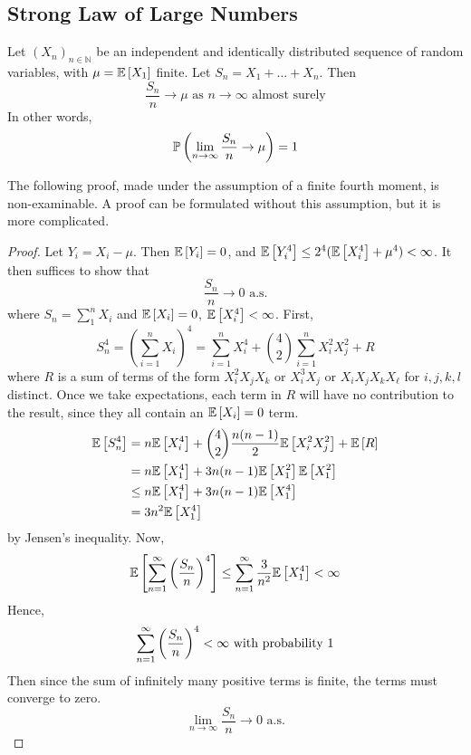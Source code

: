 \documentclass{article}
\begin{document}
\subsection{Strong Law of Large Numbers}
\begin{theorem}
	Let $(X_n)_{n \in \mathbb N}$ be an independent and identically distributed sequence of random variables, with $\mu = \mathbb{E}\left[{X_1}\right]$ finite. Let $S_n = X_1 + \dots + X_n$. Then
	\[ \frac{S_n}{n} \to \mu \text{ as } n \to \infty \text{ almost surely} \]
	In other words,
	\[ \mathbb{P}\left({\lim_{n \to \infty}\frac{S_n}{n}\to \mu}\right) = 1 \]
\end{theorem}
\noindent The following proof, made under the assumption of a finite fourth moment, is non-examinable. A proof can be formulated without this assumption, but it is more complicated.
\begin{proof}
	Let $Y_i = X_i - \mu$. Then $\mathbb{E}\left[{Y_i}\right] = 0$, and $\mathbb{E}\left[{Y_i^4}\right] \leq 2^4(\mathbb{E}\left[{X_i^4}\right] + \mu^4) < \infty$. It then suffices to show that
	\[ \frac{S_n}{n} \to 0 \text{ a.s.} \]
	where $S_n = \sum_1^n X_i$ and $\mathbb{E}\left[{X_i}\right] = 0$, $\mathbb{E}\left[{X_i^4}\right] < \infty$. First,
	\[ S_n^4 = \left( \sum_{i=1}^n X_i \right)^4 = \sum_{i=1}^n X_i^4 + \binom{4}{2}\sum_{i=1}^n X_i^2 X_j^2 + R \]
	where $R$ is a sum of terms of the form $X_i^2 X_j X_k$ or $X_i^3 X_j$ or $X_i X_j X_k X_\ell$ for $i, j, k, l$ distinct. Once we take expectations, each term in $R$ will have no contribution to the result, since they all contain an $\mathbb{E}\left[{X_i}\right] = 0$ term.
	\begin{align*}
		\mathbb{E}\left[{S_n^4}\right] &= n\mathbb{E}\left[{X_i^4}\right] + \binom{4}{2}\frac{n(n-1)}{2}\mathbb{E}\left[{X_i^2 X_j^2}\right] + \mathbb{E}\left[{R}\right] \\
		&= n\mathbb{E}\left[{X_1^4}\right] + 3n(n-1)\mathbb{E}\left[{X_1^2}\right]\mathbb{E}\left[{X_1^2}\right] \\
		&\leq n\mathbb{E}\left[{X_1^4}\right] + 3n(n-1)\mathbb{E}\left[{X_1^4}\right] \\
		&= 3n^2\mathbb{E}\left[{X_1^4}\right]
	\end{align*}
	by Jensen's inequality. Now,
	\[ \mathbb{E}\left[{\sum_{n=1}^\infty \qty(\frac{S_n}{n})^4}\right] \leq \sum_{n=1}^\infty \frac{3}{n^2}\mathbb{E}\left[{X_1^4}\right] < \infty \]
	Hence,
	\[ \sum_{n=1}^\infty \qty(\frac{S_n}{n})^4 < \infty \text{ with probability 1} \]
	Then since the sum of infinitely many positive terms is finite, the terms must converge to zero.
	\[ \lim_{n\to\infty}\frac{S_n}{n} \to 0 \text{ a.s.} \]
\end{proof}
\end{document}
